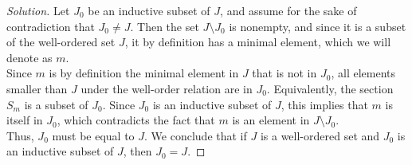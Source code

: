 \documentclass[11pt]{article}
\newenvironment{solution}
  {\renewcommand\qedsymbol{$\blacksquare$}\begin{proof}[Solution]}
  {\end{proof}}
\begin{document}
\begin{solution}
Let $J_0$ be an inductive subset of $J$, and assume for the sake of contradiction that $J_0 \neq J$. Then the set $J \setminus J_0$ is nonempty, and since it is a subset
of the well-ordered set $J$, it by definition has a minimal element, which we will denote as $m$. \\

Since $m$ is by definition the minimal element in $J$ that is not in $J_0$, all elements smaller than $J$ under the well-order relation are in $J_0$. 
Equivalently, the section $S_m$ is a subset of $J_0$. Since $J_0$ is an inductive subset of $J$, this implies that $m$ is itself in $J_0$, which contradicts the fact that
$m$ is an element in $J \setminus J_0$. \\

Thus, $J_0$ must be equal to $J$. We conclude that if $J$ is a well-ordered set and $J_0$ is an inductive subset of $J$, then $J_0 = J$.
\end{solution}
\end{document}
